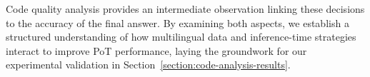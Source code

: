 Code quality analysis provides an intermediate observation linking these decisions to the accuracy of the final answer. 
%
By examining both aspects, we establish a structured understanding of how multilingual data and inference-time strategies interact to improve PoT performance, laying the groundwork for our experimental validation in Section~\ref{section:code-analysis-results}.

















\begin{table*}[ht]
\tiny
  \centering
\end{table*}
